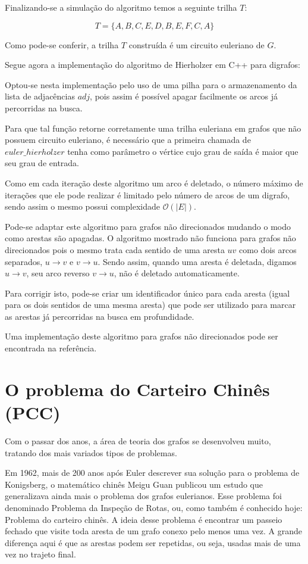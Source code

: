 \documentclass[12pt, a4paper]{article}
\begin{document}
Finalizando-se a simulação do algoritmo temos a seguinte trilha $T$:

\[
    T = \{A, B, C, E, D, B, E, F, C, A\}
\]

Como pode-se conferir, a trilha $T$ construída é um circuito euleriano de $G$.


Segue agora a implementação do algoritmo de Hierholzer em C++ para digrafos:



Optou-se nesta implementação pelo uso de uma pilha para o armazenamento da lista de adjacências $adj$, pois assim é possível apagar facilmente os arcos já percorridas na busca.


Para que tal função retorne corretamente uma trilha euleriana em grafos que não possuem circuito euleriano, é necessário que a primeira chamada de $euler\_hierholzer$ tenha como parâmetro o vértice cujo grau de saída é maior que seu grau de entrada.

Como em cada iteração deste algoritmo um arco é deletado, o número máximo de iterações que ele pode realizar é limitado pelo número de arcos de um digrafo, sendo assim o mesmo possui complexidade $\mathcal{O}(|E|)$.

Pode-se adaptar este algoritmo para grafos não direcionados mudando o modo como arestas são apagadas.
O algoritmo mostrado não funciona para grafos não direcionados pois o mesmo trata cada sentido de uma aresta $uv$ como dois arcos separados, $u \rightarrow v$ e $v \rightarrow u$. 
Sendo assim, quando uma aresta é deletada, digamos $u \rightarrow v$, seu arco reverso $v \rightarrow u$, não é deletado automaticamente.

Para corrigir isto, pode-se criar um identificador único para cada aresta (igual para os dois sentidos de uma mesma aresta) que pode ser utilizado para marcar as arestas já percorridas na busca em profundidade. 

Uma implementação deste algoritmo para grafos não direcionados pode ser encontrada na referência\cite{hierholzer-und}.


\section{O problema do Carteiro Chinês (PCC)}

Com o passar dos anos, a área de teoria dos grafos se desenvolveu muito, tratando dos mais variados tipos de problemas.

Em 1962, mais de 200 anos após Euler descrever sua solução para o problema de Konigsberg, o matemático chinês Meigu Guan publicou um estudo que generalizava ainda mais o problema dos grafos eulerianos. 
Esse problema foi denominado Problema da Inspeção de Rotas, ou, como também é conhecido hoje: Problema do carteiro chinês.
A ideia desse problema é encontrar um passeio fechado que visite toda aresta de um grafo conexo pelo menos uma vez. 
A grande diferença aqui é que as arestas podem ser repetidas, ou seja, usadas mais de uma vez no trajeto final.
\end{document}
